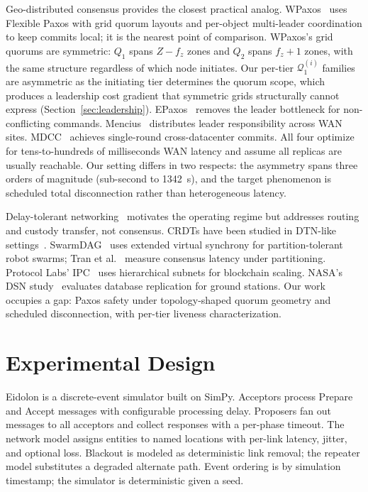 \documentclass[11pt]{article}
\begin{document}
Geo-distributed consensus provides the closest practical analog. WPaxos~\cite{ailijiang2019wpaxos} uses Flexible Paxos with grid quorum layouts and per-object multi-leader coordination to keep commits local; it is the nearest point of comparison. WPaxos's grid quorums are symmetric: $Q_1$ spans $Z - f_z$ zones and $Q_2$ spans $f_z + 1$ zones, with the same structure regardless of which node initiates. Our per-tier $\mathcal{Q}_1^{(i)}$ families are asymmetric as the initiating tier determines the quorum scope, which produces a leadership cost gradient that symmetric grids structurally cannot express (Section~\ref{sec:leadership}). EPaxos~\cite{moraru2013} removes the leader bottleneck for non-conflicting commands. Mencius~\cite{mao2008} distributes leader responsibility across WAN sites. MDCC~\cite{kraska2013} achieves single-round cross-datacenter commits. All four optimize for tens-to-hundreds of milliseconds WAN latency and assume all replicas are usually reachable. Our setting differs in two respects: the asymmetry spans three orders of magnitude (sub-second to 1342~s), and the target phenomenon is scheduled total disconnection rather than heterogeneous latency.

Delay-tolerant networking~\cite{cerf2007,fall2003} motivates the operating regime but addresses routing and custody transfer, not consensus. CRDTs have been studied in DTN-like settings~\cite{guidec2023}. SwarmDAG~\cite{tran2019swarmdag} uses extended virtual synchrony for partition-tolerant robot swarms; Tran et al.~\cite{tran2019milcom} measure consensus latency under partitioning. Protocol Labs' IPC~\cite{delarocha2022} uses hierarchical subnets for blockchain scaling. NASA's DSN study~\cite{connell2011} evaluates database replication for ground stations. Our work occupies a gap: Paxos safety under topology-shaped quorum geometry and scheduled disconnection, with per-tier liveness characterization.


\section{Experimental Design}
\label{sec:expdesign}

Eidolon is a discrete-event simulator built on SimPy. Acceptors process Prepare and Accept messages with configurable processing delay. Proposers fan out messages to all acceptors and collect responses with a per-phase timeout. The network model assigns entities to named locations with per-link latency, jitter, and optional loss. Blackout is modeled as deterministic link removal; the repeater model substitutes a degraded alternate path. Event ordering is by simulation timestamp; the simulator is deterministic given a seed.
\end{document}
